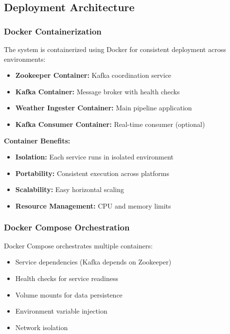 \documentclass[12pt,a4paper]{article}
\begin{document}
\subsection{Deployment Architecture}

\subsubsection{Docker Containerization}

The system is containerized using Docker for consistent deployment across environments:

\begin{itemize}
    \item \textbf{Zookeeper Container:} Kafka coordination service
    \item \textbf{Kafka Container:} Message broker with health checks
    \item \textbf{Weather Ingester Container:} Main pipeline application
    \item \textbf{Kafka Consumer Container:} Real-time consumer (optional)
\end{itemize}

\textbf{Container Benefits:}
\begin{itemize}
    \item \textbf{Isolation:} Each service runs in isolated environment
    \item \textbf{Portability:} Consistent execution across platforms
    \item \textbf{Scalability:} Easy horizontal scaling
    \item \textbf{Resource Management:} CPU and memory limits
\end{itemize}

\subsubsection{Docker Compose Orchestration}

Docker Compose orchestrates multiple containers:
\begin{itemize}
    \item Service dependencies (Kafka depends on Zookeeper)
    \item Health checks for service readiness
    \item Volume mounts for data persistence
    \item Environment variable injection
    \item Network isolation
\end{itemize}
\end{document}
